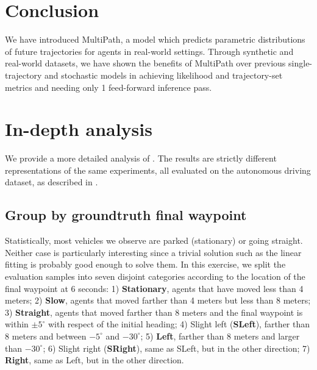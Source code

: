 \documentclass{article}
\newcommand{\multiflow}{MultiPath\xspace}
\begin{document}
\section{Conclusion}
We have introduced \multiflow, a model which predicts parametric distributions of future trajectories for agents in real-world settings.  Through synthetic and real-world datasets, we have shown the benefits of \multiflow over previous single-trajectory and stochastic models in achieving likelihood and trajectory-set metrics and needing only 1 feed-forward inference pass.
 
\small{}

\small {
  }

\newpage


\appendix


\section{In-depth analysis}
\label{sec:analysis}

We provide a more detailed analysis of . The results are strictly different representations of the same experiments, all evaluated on the autonomous driving dataset, as described in .


\subsection{Group by groundtruth final waypoint}

Statistically, most vehicles we observe are parked (stationary) or going straight. Neither case is particularly interesting since a trivial solution such as the linear fitting is probably good enough to solve them. In this exercise, we split the evaluation samples into seven disjoint categories according to the location of the final waypoint at 6 seconds: 1) \textbf{Stationary}, agents that have moved less than 4 meters; 2) \textbf{Slow}, agents that moved farther than 4 meters but less than 8 meters; 3) \textbf{Straight}, agents that moved farther than 8 meters and the final waypoint is within $\pm 5^{\circ}$ with respect of the initial heading; 4) Slight left (\textbf{SLeft}), farther than 8 meters and between $-5^{\circ}$ and $-30^{\circ}$; 5) \textbf{Left}, farther than 8 meters and larger than $-30^{\circ}$; 6) Slight right (\textbf{SRight}), same as SLeft, but in the other direction; 7) \textbf{Right}, same as Left, but in the other direction.
\end{document}
